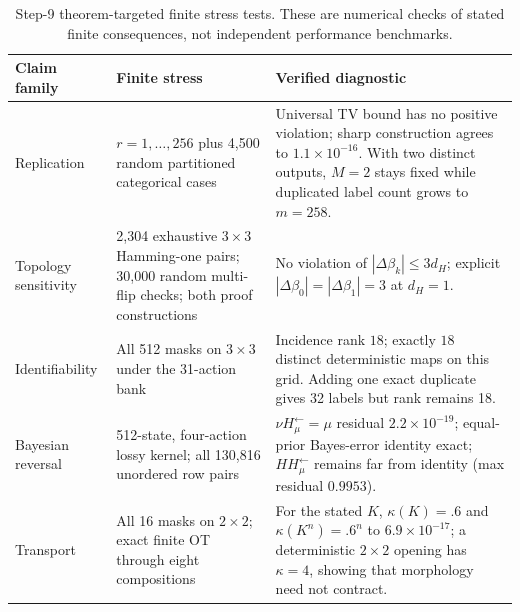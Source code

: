\begin{table}[t]
\centering
\caption{Step-9 theorem-targeted finite stress tests. These are numerical checks of stated finite consequences, not independent performance benchmarks.}
\label{tab:step9theorem}
\scriptsize
\begin{tabular}{p{.18\linewidth}p{.28\linewidth}p{.44\linewidth}}
\toprule
Claim family & Finite stress & Verified diagnostic\\
\midrule
Replication & $r=1,\ldots,256$ plus 4,500 random partitioned categorical cases & Universal TV bound has no positive violation; sharp construction agrees to $1.1\times10^{-16}$. With two distinct outputs, $M=2$ stays fixed while duplicated label count grows to $m=258$.\\
Topology sensitivity & 2,304 exhaustive $3\times3$ Hamming-one pairs; 30,000 random multi-flip checks; both proof constructions & No violation of $|\Delta\beta_k|\le 3d_H$; explicit $|\Delta\beta_0|=|\Delta\beta_1|=3$ at $d_H=1$.\\
Identifiability & All 512 masks on $3\times3$ under the 31-action bank & Incidence rank $18$; exactly $18$ distinct deterministic maps on this grid. Adding one exact duplicate gives 32 labels but rank remains 18.\\
Bayesian reversal & 512-state, four-action lossy kernel; all 130,816 unordered row pairs & $\nu H_\mu^{\leftarrow}=\mu$ residual $2.2\times10^{-19}$; equal-prior Bayes-error identity exact; $HH_\mu^{\leftarrow}$ remains far from identity (max residual $0.9953$).\\
Transport & All 16 masks on $2\times2$; exact finite OT through eight compositions & For the stated $K$, $\kappa(K)=.6$ and $\kappa(K^n)=.6^n$ to $6.9\times10^{-17}$; a deterministic $2\times2$ opening has $\kappa=4$, showing that morphology need not contract.\\
\bottomrule
\end{tabular}
\end{table}

